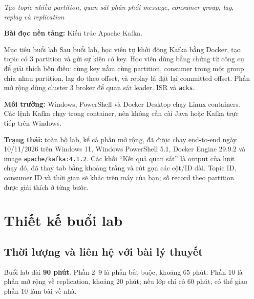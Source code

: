 
\begin{center}\large \emph{Tạo topic nhiều partition, quan sát phân phối message, consumer group, lag, replay và replication}\end{center}

\textbf{Bài đọc nền tảng:} Kiến trúc Apache Kafka.


\begin{infobox}{Mục tiêu buổi lab}
Sau buổi lab, học viên tự khởi động Kafka bằng Docker, tạo topic có 3 partition và gửi sự kiện có key. Học viên dùng bằng chứng từ công cụ để giải thích bốn điều: cùng key nằm cùng partition, consumer trong một group chia nhau partition, lag đo theo offset, và replay là đặt lại committed offset. Phần mở rộng dùng cluster 3 broker để quan sát leader, ISR và \texttt{acks}.
\end{infobox}

\textbf{Môi trường:} Windows, PowerShell và Docker Desktop chạy Linux containers. Các lệnh Kafka chạy trong container, nên không cần cài Java hoặc Kafka trực tiếp trên Windows.


\begin{notebox}
\textbf{Trạng thái:} toàn bộ lab, kể cả phần mở rộng, đã được chạy end-to-end ngày 10/11/2026 trên Windows 11, Windows PowerShell 5.1, Docker Engine 29.9.2 và image \texttt{apache/\allowbreak{}kafka:4.\allowbreak{}1.\allowbreak{}2}. Các khối “Kết quả quan sát” là output của lượt chạy đó, đã thay tab bằng khoảng trắng và rút gọn các cột/ID dài. Topic ID, consumer ID và thời gian sẽ khác trên máy của bạn; số record theo partition được giải thích ở từng bước.
\end{notebox}

\tableofcontents
\clearpage

\section{Thiết kế buổi lab}

\subsection{Thời lượng và liên hệ với bài lý thuyết}

Buổi lab dài \textbf{90 phút}. Phần 2--9 là phần bắt buộc, khoảng 65 phút. Phần 10 là phần mở rộng về replication, khoảng 20 phút; nếu lớp chỉ có 60 phút, có thể giao phần 10 làm bài về nhà.



